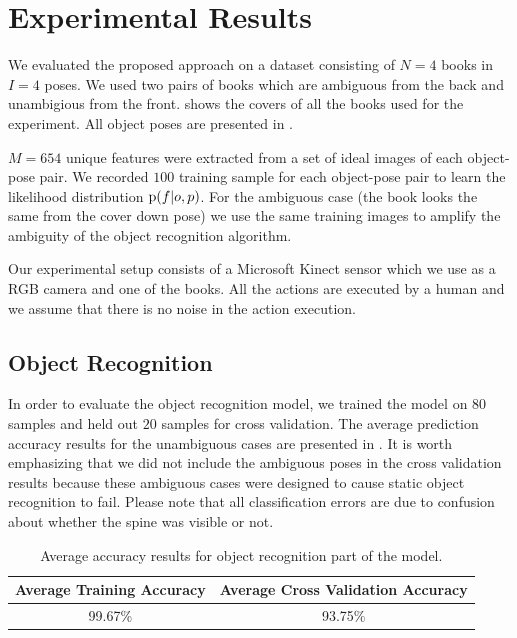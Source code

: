 \section{Experimental Results}



    We evaluated the proposed approach on a dataset consisting of $N = 4$ books in $I = 4$ poses. We used two pairs of books which are ambiguous from the back and unambigious from the front.  shows the covers of all the books used for the experiment. All object poses are presented in . 
    
$M = 654$ unique features were extracted from a set of ideal images of each object-pose pair. We recorded $100$ training sample for each object-pose pair to learn the likelihood distribution $\text{p}(f|o,p)$. For the ambiguous case (the book looks the same from the cover down pose) we use the same training images to amplify the ambiguity of the object recognition algorithm.

    Our experimental setup consists of a Microsoft Kinect sensor which we use as a RGB camera and one of the books. All the actions are executed by a human and we assume that there is no noise in the action execution. 

    \subsection{Object Recognition}
    
	In order to evaluate the object recognition model, we trained the model on $80$ samples and held out $20$ samples for cross validation. The average prediction accuracy results for the unambiguous cases are presented in . It is worth emphasizing that we did not include the ambiguous poses in the cross validation results because these ambiguous cases were designed to cause static object recognition to fail. Please note that all classification errors are due to confusion about whether the spine was visible or not.    
    
 
        
        \begin{table}[h]
                \centering
                \begin{tabular}{|c|c|}
                \hline
                Average Training Accuracy & Average Cross Validation Accuracy \\
                \hline
                99.67\% & 93.75\% \\
                \hline
                \end{tabular}
                \caption{Average accuracy results for object recognition part of the model.}
                \label{tab:accuracy}
		\end{table}

